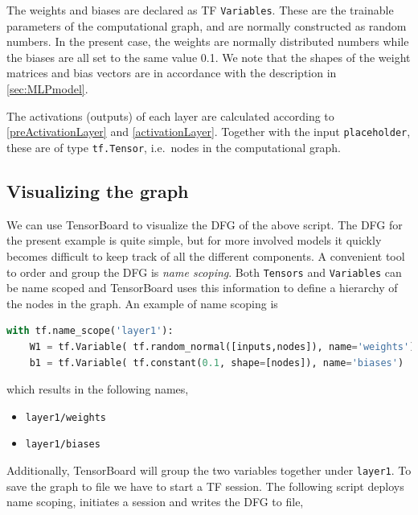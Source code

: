 \documentclass[twoside,english]{uiofysmaster}
\begin{document}
The weights and biases are declared as TF \texttt{Variables}. These are the trainable parameters 
of the computational graph, and are normally constructed as random numbers. In the present case,
the weights are normally distributed numbers while the biases are all set to the same value 0.1. 
We note that the shapes of the weight matrices and bias vectors are in accordance with the description in 
\autoref{sec:MLPmodel}.

The activations (outputs) of each layer are calculated according to \eqref{preActivationLayer} and \eqref{activationLayer}. 
Together with the input \texttt{placeholder}, these are of type \texttt{tf.Tensor}, i.e.\ nodes in the computational 
graph. 

\subsection{Visualizing the graph}
We can use TensorBoard to visualize the DFG of the above script. The DFG for the present example is quite
simple, but for more involved models it quickly becomes difficult to keep track of all the different components. 
A convenient tool to order and group the DFG is \textit{name scoping}. Both \texttt{Tensors} and \texttt{Variables} can 
be name scoped and TensorBoard uses this information to define a hierarchy of the nodes in the graph. 
An example of name scoping is
\begin{lstlisting}[language=python]
 with tf.name_scope('layer1'):
    W1 = tf.Variable( tf.random_normal([inputs,nodes]), name='weights')
    b1 = tf.Variable( tf.constant(0.1, shape=[nodes]), name='biases')
\end{lstlisting}
which results in the following names,
\begin{itemize}
 \item \texttt{layer1/weights}
 \item \texttt{layer1/biases}
\end{itemize}
Additionally, TensorBoard will group the two variables together under \texttt{layer1}. 
To save the graph to file we have to start a TF session. The following script 
deploys name scoping, initiates a session and writes the DFG to file,
\end{document}
